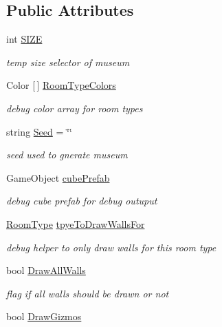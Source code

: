 \subsection*{Public Attributes}
\begin{DoxyCompactItemize}
\item 
int \mbox{\hyperlink{class_museum_generator_a3274560824ac1574cf5b23b70c93f549}{S\+I\+ZE}}
\begin{DoxyCompactList}\small\item\em temp size selector of museum \end{DoxyCompactList}\item 
Color \mbox{[}$\,$\mbox{]} \mbox{\hyperlink{class_museum_generator_abc5bc077cf9c07228ecc90887c534373}{Room\+Type\+Colors}}
\begin{DoxyCompactList}\small\item\em debug color array for room types \end{DoxyCompactList}\item 
string \mbox{\hyperlink{class_museum_generator_a79420e442fa719cbcbceb76df5659209}{Seed}} = \char`\"{}\char`\"{}
\begin{DoxyCompactList}\small\item\em seed used to gnerate museum \end{DoxyCompactList}\item 
Game\+Object \mbox{\hyperlink{class_museum_generator_ae7a748c64ae256fdc85e29a79a2fc0a8}{cube\+Prefab}}
\begin{DoxyCompactList}\small\item\em debug cube prefab for debug outuput \end{DoxyCompactList}\item 
\mbox{\hyperlink{_room_8cs_ab540f7414f306325d92272bcef1e34e1}{Room\+Type}} \mbox{\hyperlink{class_museum_generator_aba3c9dafe2095b617ca22049f2b83b5f}{tpye\+To\+Draw\+Walls\+For}}
\begin{DoxyCompactList}\small\item\em debug helper to only draw walls for this room type \end{DoxyCompactList}\item 
bool \mbox{\hyperlink{class_museum_generator_a3a354ad136bc8f11fce23708625ccfde}{Draw\+All\+Walls}}
\begin{DoxyCompactList}\small\item\em flag if all walls should be drawn or not \end{DoxyCompactList}\item 
bool \mbox{\hyperlink{class_museum_generator_a102f8361f66eb629d3ad5c9951616b42}{Draw\+Gizmos}}

\end{DoxyCompactItemize}
